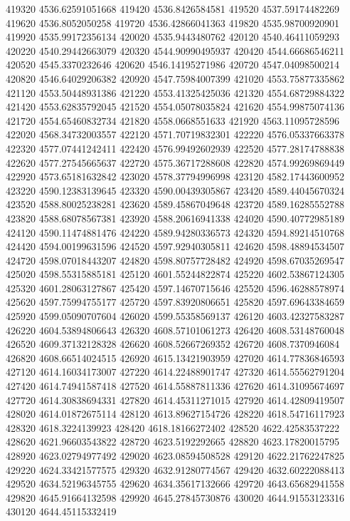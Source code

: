 {419320 4536.62591051668
419420 4536.8426584581
419520 4537.59174482269
419620 4536.8052050258
419720 4536.42866041363
419820 4535.98700920901
419920 4535.99172356134
420020 4535.9443480762
420120 4540.46411059293
420220 4540.29442663079
420320 4544.90990495937
420420 4544.66686546211
420520 4545.3370232646
420620 4546.14195271986
420720 4547.04098500214
420820 4546.64029206382
420920 4547.75984007399
421020 4553.75877335862
421120 4553.50448931386
421220 4553.41325425036
421320 4554.68729884322
421420 4553.62835792045
421520 4554.05078035824
421620 4554.99875074136
421720 4554.65460832734
421820 4558.0668551633
421920 4563.11095728596
422020 4568.34732003557
422120 4571.70719832301
422220 4576.05337663378
422320 4577.07441242411
422420 4576.99492602939
422520 4577.28174788838
422620 4577.27545665637
422720 4575.36717288608
422820 4574.99269869449
422920 4573.65181632842
423020 4578.37794996998
423120 4582.17443600952
423220 4590.12383139645
423320 4590.00439305867
423420 4589.44045670324
423520 4588.80025238281
423620 4589.45867049648
423720 4589.16285552788
423820 4588.68078567381
423920 4588.20616941338
424020 4590.40772985189
424120 4590.11474881476
424220 4589.94280336573
424320 4594.89214510768
424420 4594.00199631596
424520 4597.92940305811
424620 4598.48894534507
424720 4598.07018443207
424820 4598.80757728482
424920 4598.67035269547
425020 4598.55315885181
425120 4601.55244822874
425220 4602.53867124305
425320 4601.28063127867
425420 4597.14670715646
425520 4596.46288578974
425620 4597.75994755177
425720 4597.83920806651
425820 4597.69643384659
425920 4599.05090707604
426020 4599.55358569137
426120 4603.42327583287
426220 4604.53894806643
426320 4608.57101061273
426420 4608.53148760048
426520 4609.37132128328
426620 4608.52667269352
426720 4608.7370946084
426820 4608.66514024515
426920 4615.13421903959
427020 4614.77836846593
427120 4614.16034173007
427220 4614.22488901747
427320 4614.55562791204
427420 4614.74941587418
427520 4614.55887811336
427620 4614.31095674697
427720 4614.30838694331
427820 4614.45311271015
427920 4614.42809419507
428020 4614.01872675114
428120 4613.89627154726
428220 4618.54716117923
428320 4618.3224139923
428420 4618.18166272402
428520 4622.42583537222
428620 4621.96603543822
428720 4623.5192292665
428820 4623.17820015795
428920 4623.02794977492
429020 4623.08594508528
429120 4622.21762247825
429220 4624.33421577575
429320 4632.91280774567
429420 4632.60222088413
429520 4634.52196345755
429620 4634.35617132666
429720 4643.65682941558
429820 4645.91664132598
429920 4645.27845730876
430020 4644.91553123316
430120 4644.45115332419
}
